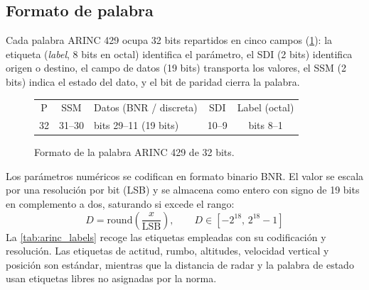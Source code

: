 \subsection{Formato de palabra}
\label{sec:fw_word}

Cada palabra ARINC 429 ocupa 32 bits repartidos en cinco campos
(\cref{fig:arinc_word}): la etiqueta (\textit{label}, 8 bits en octal)
identifica el parámetro, el SDI (2 bits) identifica origen o destino, el campo
de datos (19 bits) transporta los valores, el SSM (2 bits) indica el estado del
dato, y el bit de paridad cierra la palabra.

\begin{figure}[H]
    \centering
    \setlength{\tabcolsep}{3pt}\renewcommand{\arraystretch}{1.2}
    \begin{tabularx}{\linewidth}{|c|c|>{\centering\arraybackslash}X|c|c|}
        \hline
        \cellcolor{orange!18}P & SSM & \cellcolor{blue!8}Datos (BNR / discreta) & SDI & \cellcolor{background_light}Label (octal) \\
        \scriptsize 32 & \scriptsize 31--30 & \scriptsize bits 29--11 (19 bits) & \scriptsize 10--9 & \scriptsize bits 8--1 \\
        \hline
    \end{tabularx}
    \caption{Formato de la palabra ARINC 429 de 32 bits.}
    \label{fig:arinc_word}
\end{figure}

Los parámetros numéricos se codifican en formato binario BNR. El valor se escala
por una resolución por bit (LSB) y se almacena como entero con signo de 19 bits
en complemento a dos, saturando si excede el rango:
\begin{equation}
    D = \mathrm{round}\!\left(\frac{x}{\text{LSB}}\right),
    \qquad D \in \left[-2^{18},\, 2^{18}-1\right]
\end{equation}
La \cref{tab:arinc_labels} recoge las etiquetas empleadas con su codificación y
resolución. Las etiquetas de actitud, rumbo, altitudes, velocidad vertical y
posición son estándar, mientras que la distancia de radar y la palabra de estado usan
etiquetas libres no asignadas por la norma.


